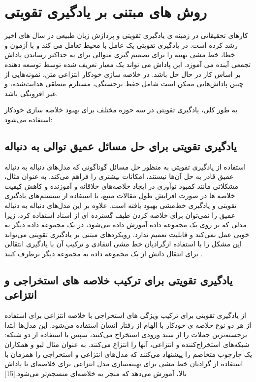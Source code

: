 \chapter{روش های مبتنی بر یادگیری تقویتی}

کارهای تحقیقاتی در زمینه ی یادگیری تقویتی 
و پردازش زبان طبیعی در سال های اخیر رشد کرده است. در یادگیری تقویتی  یک عامل با محیط تعامل می کند و با آزمون و خطا، خط مشی بهینه را برای تصمیم گیری متوالی برای به حداکثر رساندن پاداش تجمعی آینده می آموزد. این پاداش می تواند یک معیار تعریف شده توسط توسعه دهنده بر اساس کار در حال حل باشد. در خلاصه سازی خودکار انتزاعی متن، نمونه‌هایی از چنین پاداش‌هایی ممکن است شامل حفظ برجستگی، مستلزم منطقی هدایت‌شده، و غیر افزونگی باشد. 

به طور کلی،  یادگیری تقویتی  در سه حوزه مختلف برای بهبود خلاصه سازی خودکار استفاده می‌شود:

\section{یادگیری تقویتی برای حل مسائل عمیق توالی به دنباله}

استفاده از یادگیری تقویتی به منظور حل مسائل گوناگونی که مدل‌های دنباله به دنباله عمیق قادر به حل آن‌ها نیستند، امکانات بیشتری را فراهم می‌کند. به عنوان مثال، مشکلاتی مانند کمبود نوآوری در ایجاد خلاصه‌های خلاقانه و آموزنده و کاهش کیفیت خلاصه ها در صورت افزایش طول مقالات منبع، با استفاده از سیستم‌های یادگیری تقویتی و یادگیری خط‌مشی		 بهبود یافته است.
 علاوه بر این  مدل‌های دنباله به دنباله عمیق را نمی‌توان برای خلاصه کردن طیف گسترده ای از اسناد استفاده کرد، زیرا مدلی که بر روی یک مجموعه داده آموزش داده می‌شود، در یک مجموعه داده دیگر به خوبی عمل نمی‌کند و قابلیت تعمیم ندارد. رویکردهای مبتنی بر یادگیری تقویتی می‌تواند این  مشکل را با استفاده ازگرادیان خط مشی انتقادی
  و ترکیب آن با یادگیری انتقالی
برای انتقال دانش از یک مجموعه داده به مجموعه دیگر برطرف کنند
\cite{DeepTL_RL}.


\section{یادگیری تقویتی برای ترکیب خلاصه های استخراجی و انتزاعی} 
  از یادگیری تقویتی برای ترکیب ویژگی های استخراجی با خلاصه انتزاعی برای استفاده از هر دو نوع خلاصه ی خودکار با الهام از رفتار انسان استفاده می‌شود. این مدل‌ها ابتدا برجسته‌ترین جملات را از سند ورودی استخراج می‌کنند، سپس با استفاده از دو شبکه: شبکه‌های استخراج‌کننده و انتزاعی، آنها را انتزاع می‌کنند. به عنوان مثال لیو و همکاران یک چارچوب متخاصم را پیشنهاد می‌کنند که مدل‌های انتزاعی و استخراجی را همزمان با استفاده از گرادیان خط ‌مشی برای بهینه‌سازی مدل انتزاعی برای خلاصه‌ای با پاداش بالا، آموزش می‌دهد که منجر به خلاصه‌ای منسجم‌تر می‌شود.[15]


